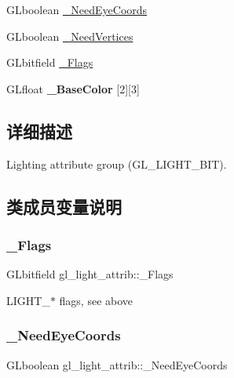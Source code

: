 \textbf{ }\par
\begin{DoxyCompactItemize}
\item 
G\+Lboolean \hyperlink{structgl__light__attrib_a5705e21184b82e30f54d2ecd066b8101}{\+\_\+\+Need\+Eye\+Coords}
\item 
G\+Lboolean \hyperlink{structgl__light__attrib_a9b62e43821db9342aacbf4d4f653a156}{\+\_\+\+Need\+Vertices}
\item 
G\+Lbitfield \hyperlink{structgl__light__attrib_af7353bf73efa6a5d46771490b8724a15}{\+\_\+\+Flags}
\item 
\mbox{\label{structgl__light__attrib_accb5c994c72c6984b7b2f0e0270525f3}} 
G\+Lfloat {\bfseries \+\_\+\+Base\+Color} \mbox{[}2\mbox{]}\mbox{[}3\mbox{]}
\end{DoxyCompactItemize}



\subsection{详细描述}
Lighting attribute group (G\+L\+\_\+\+L\+I\+G\+H\+T\+\_\+\+B\+IT). 

\subsection{类成员变量说明}
\mbox{\label{structgl__light__attrib_af7353bf73efa6a5d46771490b8724a15}} 
\subsubsection{\texorpdfstring{\+\_\+\+Flags}{\_Flags}}
{\footnotesize\ttfamily G\+Lbitfield gl\+\_\+light\+\_\+attrib\+::\+\_\+\+Flags}

L\+I\+G\+H\+T\+\_\+$\ast$ flags, see above \mbox{\label{structgl__light__attrib_a5705e21184b82e30f54d2ecd066b8101}} 
\subsubsection{\texorpdfstring{\+\_\+\+Need\+Eye\+Coords}{\_NeedEyeCoords}}
{\footnotesize\ttfamily G\+Lboolean gl\+\_\+light\+\_\+attrib\+::\+\_\+\+Need\+Eye\+Coords}

